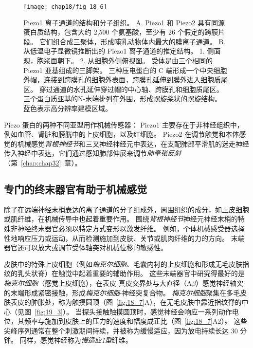 \begin{figure}[htbp]
	\centering
	\texttt{[image: chap18/fig\_18\_6]}
	\caption{Piezo1 离子通道的结构和分子组织。
		A. Piezo1 和 Piezo2 具有同源蛋白质结构，包含大约 2,500 个氨基酸，至少有 26 个假定的跨膜片段。
		它们组合成三聚体，形成哺乳动物体内最大的膜离子通道\cite{murthy2017piezos}。
		B. 从低温电子显微镜推断出的 Piezo1 离子通道的推定结构。
		1. 侧面观，胞浆面朝下。
		2. 从细胞外侧俯视图。
		受体是由三个相同的 Piezo1 亚基组成的三脚架。
		三种压电蛋白的 C 端形成一个中央细胞外帽，连接到跨膜孔的细胞外表面，跨膜孔延伸到膜外进入细胞质尾区。
		穿过通道的水孔延伸穿过帽的中心轴、跨膜孔和细胞质尾区。
		三个蛋白质亚基的N-末端排列在外围，形成螺旋桨状的螺旋结构。 
		蓝色表示高分辨率建模区域\cite{saotome2018structure}。}
	\label{fig:18_6}
\end{figure}



Piezo 蛋白的两种不同亚型用作机械传感器：
Piezo1 主要存在于非神经组织中，例如血管、肾脏和膀胱中的上皮细胞，以及红细胞。
Piezo2 在调节触觉和本体感觉的机械感觉\textit{背根神经节}和三叉神经神经元中表达，在支配肺部平滑肌的迷走神经传入神经中表达，它们通过感知肺部伸展来调节\textit{肺牵张反射}（第~\ref{chap:chap32}~章）。



\subsection{专门的终末器官有助于机械感觉}

除了在远端神经末梢表达的离子通道的分子组成外，周围组织的成分，如上皮细胞或肌纤维，在机械传导中也起着重要作用。
围绕\textit{背根神经节}神经元神经末梢的特殊非神经终末器官必须以特定方式变形以激发纤维。
例如，个体机械感受器选择性地响应压力或运动，从而检测施加到皮肤、关节或肌肉纤维的力的方向。
末端器官还可以放大或调节受体轴突对机械位移的敏感性。


皮肤中的特殊上皮细胞（例如\textit{梅克尔细胞}、毛囊内衬的上皮细胞和形成无毛皮肤指纹的乳头状脊）在触觉中起着重要的辅助作用。
这些末端器官中研究得最好的是\textit{梅克尔细胞}（感觉上皮细胞），在表皮-真皮交界处与大直径（A$\beta$）感觉神经轴突的末端形成紧密接触，形成\textit{梅克尔细胞}-神经突复合物。
\textit{梅克尔细胞}聚集在多毛皮肤表皮的肿胀处，称为触摸圆顶（图~\ref{fig:18_7}A），在无毛皮肤中靠近指纹脊的中心（见图~\ref{fig:19_3}）。
当探头接触触摸圆顶时，感觉神经会响应一系列动作电位，其频率与施加到皮肤上的压力的速度和幅度成正比（图~\ref{fig:18_7}A2）。
这些尖峰序列通常在整个刺激期间持续，并被称为缓慢适应，因为放电持续长达 30 分钟。
同样，感觉神经称为\textit{慢适应1型}纤维。


